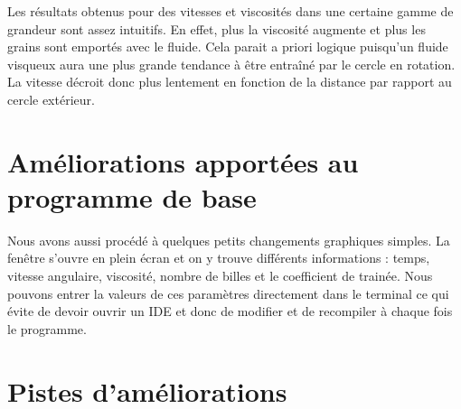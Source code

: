 \documentclass{article}
\theoremstyle{definition}
\begin{document}
%
%
%

Les résultats obtenus pour des vitesses et viscosités dans une certaine gamme de grandeur sont assez intuitifs. En effet, plus la viscosité augmente et plus les grains sont emportés avec le fluide. Cela parait a priori logique puisqu'un fluide visqueux aura une plus grande tendance à être entraîné par le cercle en rotation. La vitesse décroit donc plus lentement en fonction de la distance par rapport au cercle extérieur. \\

\section{Améliorations apportées au programme de base}

Nous avons aussi procédé à quelques petits changements graphiques simples. La fenêtre s'ouvre en plein écran et on y trouve différents informations : temps, vitesse angulaire, viscosité, nombre de billes et le coefficient de trainée. Nous pouvons entrer la valeurs de ces paramètres directement dans le terminal ce qui évite de devoir ouvrir un IDE et donc de modifier et de recompiler à chaque fois le programme. 

\section{Pistes d'améliorations}
\end{document}
